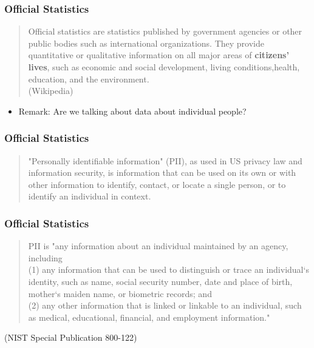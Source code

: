 \documentclass{beamer}
\begin{document}
\begin{frame}
\frametitle{Official Statistics}
\begin{quotation}
\noindent Official statistics are statistics published by government agencies or other public bodies such as international organizations. They provide quantitative or qualitative information on all major areas of \textbf{citizens' lives}, such as economic and social development, living conditions,health, education, and the environment.\\ (Wikipedia)
\end{quotation}

\begin{itemize}
\item Remark: Are we talking about data about individual people?
\end{itemize}
\end{frame}
\begin{frame}
	\frametitle{Official Statistics}
	\begin{quotation}
"Personally identifiable information" (PII), as used in US privacy law and information security, is information that can be used on its own or with other information to identify, contact, or locate a single person, or to identify an individual in context. 
\end{quotation}
\end{frame}
\begin{frame}
\frametitle{Official Statistics}
\begin{quotation}
\noindent  PII is "any information about an individual maintained by an agency, including \\ (1) any information that can be used to distinguish or trace an individual‘s identity, such as name, social security number, date and place of birth, mother‘s maiden name, or biometric records; and \\ (2) any other information that is linked or linkable to an individual, such as medical, educational, financial, and employment information."
\end{quotation}
(NIST Special Publication 800-122)
\end{frame}
\end{document}
